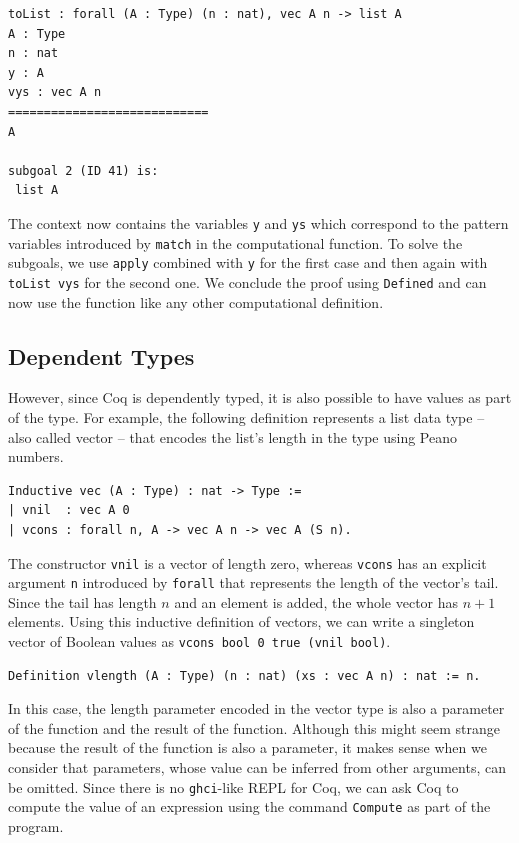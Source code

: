 \documentclass[a4paper, 11pt, fleqn, twoside]{scrreprt}
\newcommand{\hinl}[1]{\texttt{#1}}
\newcommand{\cinl}[1]{\texttt{#1}}
\begin{document}
\begin{verbatim}
toList : forall (A : Type) (n : nat), vec A n -> list A
A : Type
n : nat
y : A
vys : vec A n
============================
A

subgoal 2 (ID 41) is:
 list A
\end{verbatim}

The context now contains the variables \cinl{y} and \cinl{ys} which correspond to the pattern variables introduced by \cinl{match} in the computational function.
To solve the subgoals, we use \cinl{apply} combined with \cinl{y} for the first case and then again with \cinl{toList vys} for the second one.
We conclude the proof using \cinl{Defined} and can now use the function like any other computational definition.

\subsection{Dependent Types}
\label{subsec:dependent}

However, since Coq is dependently typed, it is also possible to have values as part of the type.
For example, the following definition represents a list data type -- also called vector -- that encodes the list's length in the type using Peano numbers.

\begin{verbatim}
Inductive vec (A : Type) : nat -> Type :=
| vnil  : vec A 0
| vcons : forall n, A -> vec A n -> vec A (S n).
\end{verbatim}

The constructor \cinl{vnil} is a vector of length zero, whereas \cinl{vcons} has an explicit argument \cinl{n} introduced by \cinl{forall} that represents the length of the vector's tail.
Since the tail has length $n$ and an element is added, the whole vector has $n + 1$ elements.
Using this inductive definition of vectors, we can write a singleton vector of Boolean values as \cinl{vcons bool 0 true (vnil bool)}.

\begin{verbatim}
Definition vlength (A : Type) (n : nat) (xs : vec A n) : nat := n.
\end{verbatim}


In this case, the length parameter encoded in the vector type is also a parameter of the function and the result of the function.
Although this might seem strange because the result of the function is also a parameter, it makes sense when we consider that parameters, whose value can be inferred from other arguments, can be omitted.
Since there is no \hinl{ghci}-like REPL for Coq, we can ask Coq to compute the value of an expression using the command \cinl{Compute} as part of the program.
\end{document}
